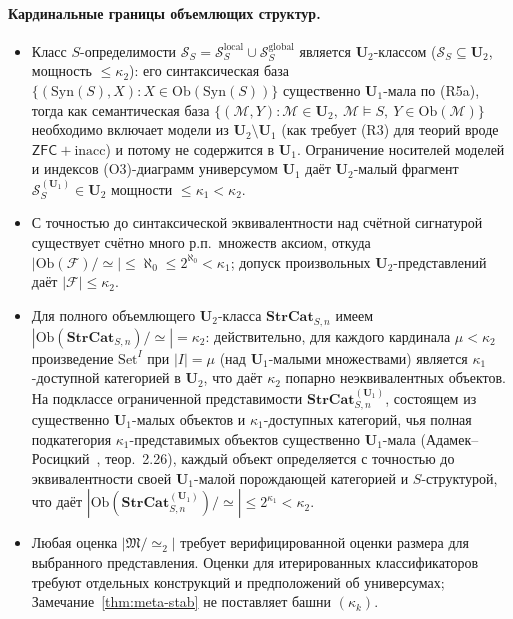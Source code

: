 \documentclass[11pt]{article}
\theoremstyle{plain}
\theoremstyle{definition}
\newcommand{\cS}{\mathcal{S}}
\newcommand{\cF}{\mathcal{F}}
\newcommand{\cM}{\mathcal{M}}
\newcommand{\fM}{\mathfrak{M}}
\newcommand{\Ob}{\mathrm{Ob}}
\newcommand{\Set}{\mathrm{Set}}
\newcommand{\Syn}{\mathrm{Syn}}
\newcommand{\ZFC}{\mathsf{ZFC}}
\begin{document}
\paragraph{Кардинальные границы объемлющих структур.}
\begin{itemize}
\item Класс $S$-определимости $\cS_S = \cS_S^{\mathrm{local}} \cup \cS_S^{\mathrm{global}}$ является $\mathbf{U}_2$-классом ($\cS_S \subseteq \mathbf{U}_2$, мощность $\le \kappa_2$): его синтаксическая база $\{(\Syn(S), X) : X \in \Ob(\Syn(S))\}$ существенно $\mathbf{U}_1$-мала по (R5a), тогда как семантическая база $\{(\cM, Y) : \cM \in \mathbf{U}_2,\ \cM \models S,\ Y \in \Ob(\cM)\}$ необходимо включает модели из $\mathbf{U}_2 \setminus \mathbf{U}_1$ (как требует (R3) для теорий вроде $\ZFC + \text{inacc}$) и потому не содержится в $\mathbf{U}_1$. Ограничение носителей моделей и индексов (O3)-диаграмм универсумом $\mathbf{U}_1$ даёт $\mathbf{U}_2$-малый фрагмент $\cS_S^{(\mathbf{U}_1)} \in \mathbf{U}_2$ мощности $\le \kappa_1 < \kappa_2$.
\item С точностью до синтаксической эквивалентности над счётной сигнатурой существует счётно много р.п.\ множеств аксиом, откуда $|\Ob(\cF)/\!\simeq| \leq \aleph_0 \le 2^{\aleph_0} < \kappa_1$; допуск произвольных $\mathbf{U}_2$-представлений даёт $|\cF| \leq \kappa_2$.
\item Для полного объемлющего $\mathbf{U}_2$-класса $\mathbf{StrCat}_{S, n}$ имеем $|\Ob(\mathbf{StrCat}_{S, n})/\!\simeq| = \kappa_2$: действительно, для каждого кардинала $\mu < \kappa_2$ произведение $\Set^I$ при $|I| = \mu$ (над $\mathbf{U}_1$-малыми множествами) является $\kappa_1$-доступной категорией в $\mathbf{U}_2$, что даёт $\kappa_2$ попарно неэквивалентных объектов. На подклассе ограниченной представимости $\mathbf{StrCat}_{S, n}^{(\mathbf{U}_1)}$, состоящем из существенно $\mathbf{U}_1$-малых объектов и $\kappa_1$-доступных категорий, чья полная подкатегория $\kappa_1$-представимых объектов существенно $\mathbf{U}_1$-мала (Адамек--Росицкий~\cite{AdamekRosicky1994}, теор.~2.26), каждый объект определяется с точностью до эквивалентности своей $\mathbf{U}_1$-малой порождающей категорией и $S$-структурой, что даёт $|\Ob(\mathbf{StrCat}_{S, n}^{(\mathbf{U}_1)})/\!\simeq| \leq 2^{\kappa_1} < \kappa_2$.
\item Любая оценка $|\fM / \!\simeq_2|$ требует верифицированной оценки размера для выбранного представления. Оценки для итерированных классификаторов требуют отдельных конструкций и предположений об универсумах; Замечание~\ref{thm:meta-stab} не поставляет башни $(\kappa_k)$.
\end{itemize}
\end{document}
